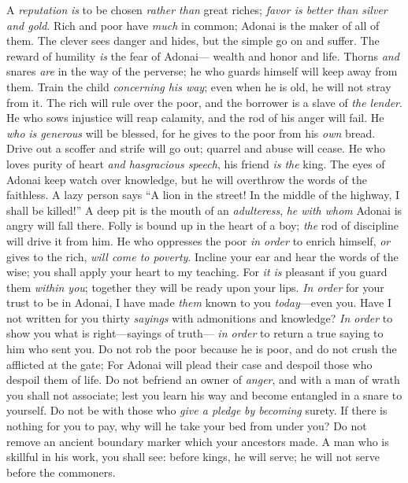 \begin{biblechapter} %
\verse A \textit{reputation} \textit{is} to be chosen \textit{rather than} great riches; 
\textit{favor is better than silver and gold}.
\verse Rich and poor have \textit{much} in common; 
Adonai is the maker of all of them.
\verse The clever sees danger and hides, 
but the simple go on and suffer.
\verse The reward of humility \textit{is} the fear of Adonai— 
wealth and honor and life.
\verse Thorns \textit{and} snares \textit{are} in the way of the perverse; 
he who guards himself will keep away from them.
\verse Train the child \textit{concerning his way}; 
even when he is old, he will not stray from it.
\verse The rich will rule over the poor, 
and the borrower is a slave of \textit{the lender}.
\verse He who sows injustice will reap calamity, 
and the rod of his anger will fail.
\verse He \textit{who} \textit{is generous} will be blessed, 
for he gives to the poor from his \textit{own} bread.
\verse Drive out a scoffer and strife will go out; 
quarrel and abuse will cease.
\verse He who loves purity of heart 
\textit{and has}\textit{gracious speech}, his friend \textit{is the} king.
\verse The eyes of Adonai keep watch over knowledge, 
but he will overthrow the words of the faithless.
\verse A lazy person says “A lion in the street! 
In the middle of the highway, I shall be killed!”
\verse A deep pit is the mouth of an \textit{adulteress}, 
\textit{he with whom} Adonai is angry will fall there.
\verse Folly is bound up in the heart of a boy; 
\textit{the} rod of discipline will drive it from him.
\verse He who oppresses the poor \textit{in order} to enrich himself, 
\textit{or} gives to the rich, \textit{will come to poverty}.
 Incline your ear and hear the words of the wise; 
you shall apply your heart to my teaching.
\verse For \textit{it is} pleasant if you guard them \textit{within you}; 
together they will be ready upon your lips.
\verse \textit{In order} for your trust to be in Adonai, 
I have made \textit{them} known to you \textit{today}—even you.
\verse Have I not written for you thirty \textit{sayings} 
with admonitions and knowledge?
\verse \textit{In order} to show you what is right—sayings of truth— 
\textit{in order} to return a true saying to him who sent you.
\verse Do not rob the poor because he is poor, 
and do not crush the afflicted at the gate;
\verse For Adonai will plead their case 
and despoil those who despoil them of life.
\verse Do not befriend an owner of \textit{anger}, 
and with a man of wrath you shall not associate;
\verse lest you learn his way 
and become entangled in a snare to yourself.
\verse Do not be with those who \textit{give a pledge} 
\textit{by becoming} surety.
\verse If there is nothing for you to pay, 
why will he take your bed from under you?
\verse Do not remove an ancient boundary marker 
which your ancestors made.
\verse A man who is skillful in his work, you shall see: 
before kings, he will serve; 
he will not serve before the commoners.
\end{biblechapter}

